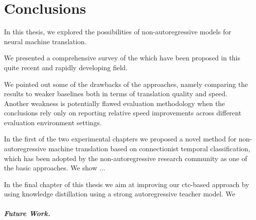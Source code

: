 \chapter{Conclusions}
\label{chap:conclusions}

In this thesis, we explored the possibilities of non-autoregressive models for
neural machine translation.

We presented a comprehensive survey of the  which have been proposed in this quite recent and rapidly
developing field. 

We pointed out some of the drawbacks of the approaches, namely  comparing the results to weaker baselines both in terms of translation
quality and speed. Another weakness is potentially flawed evaluation
methodology when the conclusions rely only on reporting relative speed
improvements across different evaluation environment settings.

In the first of the two experimental chapters  we proposed a
novel method for non-autoregressive machine translation based on connectionist
temporal classification, which has been adopted by the non-autoregressive
research community as one of the basic approaches. We show ...

In the final chapter of this thesis we aim at improving our ctc-based approach
by using knowledge distillation using a strong autoregressive teacher model.
We 

\paragraph{Future Work.}



